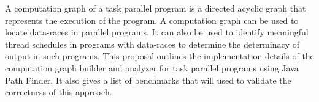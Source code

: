 A computation graph of a task parallel program is a directed acyclic graph that represents the execution of the program. A computation graph can be used to locate data-races in parallel programs. It can also be used to identify meaningful thread schedules in programs with data-races to determine the determinacy of output in such programs. This proposal outlines the implementation details of the computation graph builder and analyzer for task parallel programs using Java Path Finder. It also gives a list of benchmarks that will used to validate the correctness of this approach.
